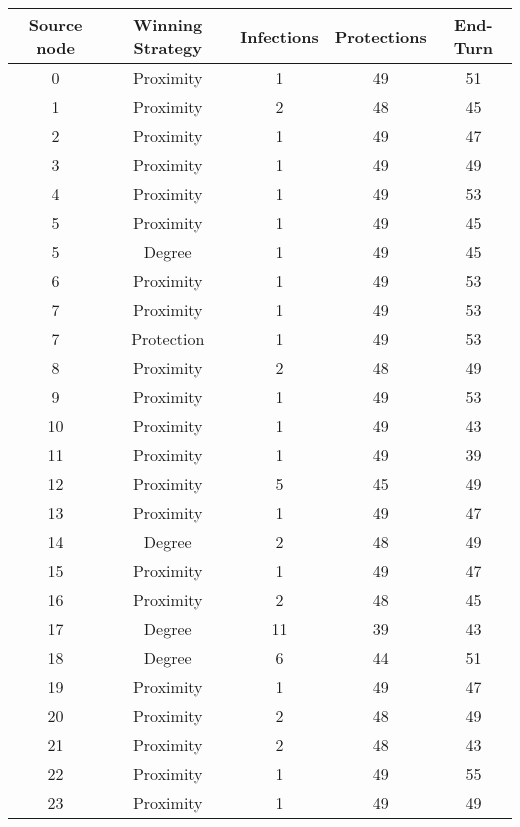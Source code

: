 \documentclass[results.tex]{subfiles}
\begin{document}
\begin{center}
  \begin{tabular}{| c || c | c | c | c |}
    \hline
    {\bfseries Source node} & {\bfseries Winning Strategy} & {\bfseries Infections} & {\bfseries Protections} & {\bfseries End-Turn} \\  %
    \hline\hline
    0 & Proximity & 1 & 49 & 51 \\ 
    \hline
    1 & Proximity & 2 & 48 & 45 \\ 
    \hline
    2 & Proximity & 1 & 49 & 47 \\ 
    \hline
    3 & Proximity & 1 & 49 & 49 \\ 
    \hline
    4 & Proximity & 1 & 49 & 53 \\ 
    \hline
    5 & Proximity & 1 & 49 & 45 \\ 
    \hline
    5 & Degree & 1 & 49 & 45 \\ 
    \hline
    6 & Proximity & 1 & 49 & 53 \\ 
    \hline
    7 & Proximity & 1 & 49 & 53 \\ 
    \hline
    7 & Protection & 1 & 49 & 53 \\ 
    \hline
    8 & Proximity & 2 & 48 & 49 \\ 
    \hline
    9 & Proximity & 1 & 49 & 53 \\ 
    \hline
    10 & Proximity & 1 & 49 & 43 \\ 
    \hline
    11 & Proximity & 1 & 49 & 39 \\ 
    \hline
    12 & Proximity & 5 & 45 & 49 \\ 
    \hline
    13 & Proximity & 1 & 49 & 47 \\ 
    \hline
    14 & Degree & 2 & 48 & 49 \\ 
    \hline
    15 & Proximity & 1 & 49 & 47 \\ 
    \hline
    16 & Proximity & 2 & 48 & 45 \\ 
    \hline
    17 & Degree & 11 & 39 & 43 \\ 
    \hline
    18 & Degree & 6 & 44 & 51 \\ 
    \hline
    19 & Proximity & 1 & 49 & 47 \\ 
    \hline
    20 & Proximity & 2 & 48 & 49 \\ 
    \hline
    21 & Proximity & 2 & 48 & 43 \\ 
    \hline
    22 & Proximity & 1 & 49 & 55 \\ 
    \hline
    23 & Proximity & 1 & 49 & 49 \\ 

\end{tabular}
\end{center}
\end{document}
